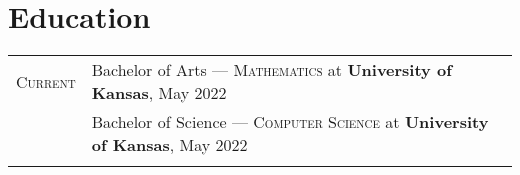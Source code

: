 \documentclass[letterpaper,10pt]{article}
\begin{document}
\section{Education}
\begin{tabular}{rl}

  \textsc{Current} & Bachelor of Arts --- \textsc{Mathematics} at \normalsize\textbf{University of Kansas}, May 2022\\
  & Bachelor of Science --- \textsc{Computer Science} at \normalsize\textbf{University of Kansas}, May 2022\\
  \\
  
\end{tabular}
\end{document}
